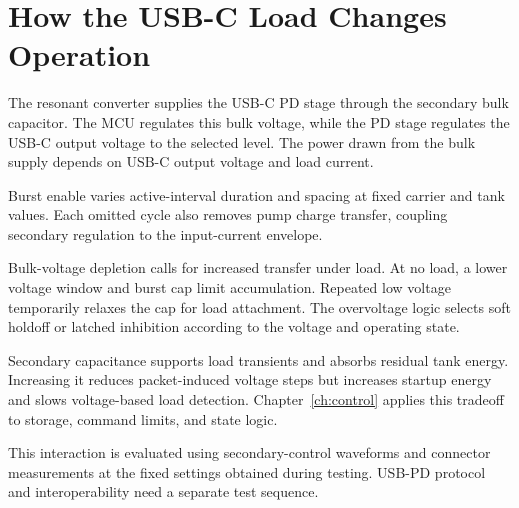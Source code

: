 \section{How the USB-C Load Changes Operation}
\label{sec:analysis-usbc}

The resonant converter supplies the USB-C PD stage through the secondary bulk capacitor. The MCU regulates this bulk voltage, while the PD stage regulates the USB-C output voltage to the selected level. The power drawn from the bulk supply depends on USB-C output voltage and load current.

Burst enable varies active-interval duration and spacing at fixed carrier and tank values. Each omitted cycle also removes pump charge transfer, coupling secondary regulation to the input-current envelope.

Bulk-voltage depletion calls for increased transfer under load. At no load, a lower voltage window and burst cap limit accumulation. Repeated low voltage temporarily relaxes the cap for load attachment. The overvoltage logic selects soft holdoff or latched inhibition according to the voltage and operating state.

Secondary capacitance supports load transients and absorbs residual tank energy. Increasing it reduces packet-induced voltage steps but increases startup energy and slows voltage-based load detection. Chapter~\ref{ch:control} applies this tradeoff to storage, command limits, and state logic.

This interaction is evaluated using secondary-control waveforms and connector measurements at the fixed settings obtained during testing. USB-PD protocol and interoperability need a separate test sequence.
